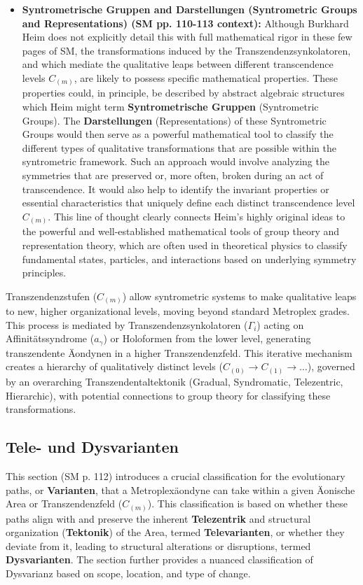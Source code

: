 \documentclass[12pt]{article}
\begin{document}
\begin{itemize}
    \item \textbf{Syntrometrische Gruppen and Darstellungen (Syntrometric Groups and Representations) (SM pp. 110-113 context):}
    Although Burkhard Heim does not explicitly detail this with full mathematical rigor in these few pages of SM, the transformations induced by the Transzendenzsynkolatoren, and which mediate the qualitative leaps between different transcendence levels \( C_{(m)} \), are likely to possess specific mathematical properties. These properties could, in principle, be described by abstract algebraic structures which Heim might term \textbf{Syntrometrische Gruppen} (Syntrometric Groups). The \textbf{Darstellungen} (Representations) of these Syntrometric Groups would then serve as a powerful mathematical tool to classify the different types of qualitative transformations that are possible within the syntrometric framework. Such an approach would involve analyzing the symmetries that are preserved or, more often, broken during an act of transcendence. It would also help to identify the invariant properties or essential characteristics that uniquely define each distinct transcendence level \( C_{(m)} \). This line of thought clearly connects Heim's highly original ideas to the powerful and well-established mathematical tools of group theory and representation theory, which are often used in theoretical physics to classify fundamental states, particles, and interactions based on underlying symmetry principles.
\end{itemize}

Transzendenzstufen (\(C_{(m)}\)) allow syntrometric systems to make qualitative leaps to new, higher organizational levels, moving beyond standard Metroplex grades. This process is mediated by Transzendenzsynkolatoren (\(\Gamma_i\)) acting on Affinitätssyndrome (\(a_\gamma\)) or Holoformen from the lower level, generating transzendente Äondynen in a higher Transzendenzfeld. This iterative mechanism creates a hierarchy of qualitatively distinct levels (\(C_{(0)} \to C_{(1)} \to \dots\)), governed by an overarching Transzendentaltektonik (Gradual, Syndromatic, Telezentric, Hierarchic), with potential connections to group theory for classifying these transformations.

\subsection{Tele- und Dysvarianten}
\label{sec:tele_dysvarianten}

This section (SM p. 112) introduces a crucial classification for the evolutionary paths, or \textbf{Varianten}, that a Metroplexäondyne can take within a given Äonische Area or Transzendenzfeld (\(C_{(m)}\)). This classification is based on whether these paths align with and preserve the inherent \textbf{Telezentrik} and structural organization (\textbf{Tektonik}) of the Area, termed \textbf{Televarianten}, or whether they deviate from it, leading to structural alterations or disruptions, termed \textbf{Dysvarianten}. The section further provides a nuanced classification of Dysvarianz based on scope, location, and type of change.
\end{document}
